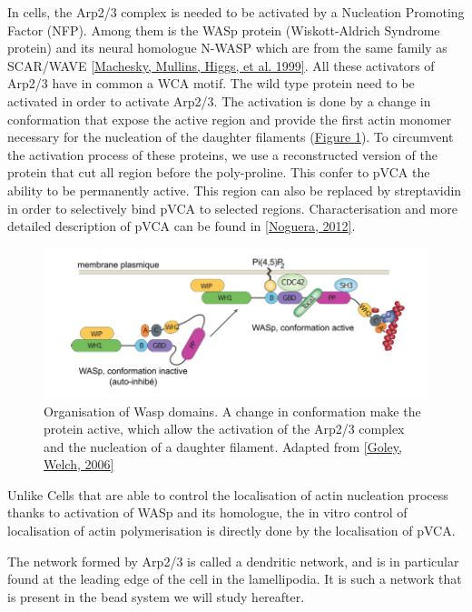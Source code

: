 \documentclass[A4paperpaper,11pt,english]{sphinxmanual}
\begin{document}
In cells, the Arp2/3 complex is needed to be activated by a Nucleation Promoting
Factor (NFP).  Among them is the  WASp protein (Wiskott-Aldrich Syndrome
protein) and its neural homologue N-WASP which are from the same family as
SCAR/WAVE {\hyperref[parts/part1:machesky1999]{{[}Machesky, Mullins, Higgs,  et al.  1999{]}}}.  All these activators of Arp2/3 have in common a
WCA motif. The wild type protein need to be activated in order to activate Arp2/3.
The activation is done by a change in conformation that expose the active
region and provide the first actin monomer necessary for the nucleation of the
daughter filaments (\hyperref[parts/part1:fig-pwa-deploy]{Figure  \ref*{parts/part1:fig-pwa-deploy}}).  To circumvent the activation process of
these proteins, we use a reconstructed version of the protein that cut all
region before the poly-proline. This confer to pVCA the ability to be
permanently active. This region can also be replaced by streptavidin in order
to selectively bind pVCA to selected regions. Characterisation and more
detailed description of pVCA can be found in {\hyperref[parts/part1:noguera2012]{{[}Noguera,  2012{]}}}.
\begin{figure}[htbp]
\centering
\capstart

\includegraphics[width=0.600\linewidth]{pwa-deploy.png}
\caption{Organisation of Wasp domains. A change in conformation make the protein
active, which allow the activation of the Arp2/3 complex and the nucleation
of a daughter filament.  Adapted from {\hyperref[parts/part1:goley2006]{{[}Goley, Welch,  2006{]}}}}\label{parts/part1:fig-pwa-deploy}\end{figure}

Unlike Cells that are able to control the localisation of actin nucleation
process thanks to activation of WASp and its homologue, the in vitro control
of localisation of actin polymerisation is directly done by the localisation of
pVCA.

The network formed by Arp2/3 is called a dendritic network, and is in
particular found at the leading edge of the cell in the lamellipodia. It is
such a network that is present in the bead system we will study hereafter.
\end{document}
